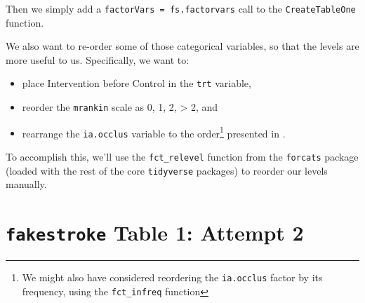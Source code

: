 \documentclass[]{book}
\newenvironment{Shaded}{\begin{snugshade}}{\end{snugshade}}
\newcommand{\KeywordTok}[1]{\textcolor[rgb]{0.13,0.29,0.53}{\textbf{#1}}}
\newcommand{\DataTypeTok}[1]{\textcolor[rgb]{0.13,0.29,0.53}{#1}}
\newcommand{\StringTok}[1]{\textcolor[rgb]{0.31,0.60,0.02}{#1}}
\newcommand{\OperatorTok}[1]{\textcolor[rgb]{0.81,0.36,0.00}{\textbf{#1}}}
\newcommand{\NormalTok}[1]{#1}
\providecommand{\tightlist}{%
  \setlength{\itemsep}{0pt}\setlength{\parskip}{0pt}}
\let\rmarkdownfootnote\footnote%
\def\footnote{\protect\rmarkdownfootnote}
\theoremstyle{definition}
\theoremstyle{definition}
\theoremstyle{definition}
\theoremstyle{remark}
\begin{document}
Then we simply add a \texttt{factorVars\ =\ fs.factorvars} call to the
\texttt{CreateTableOne} function.

We also want to re-order some of those categorical variables, so that
the levels are more useful to us. Specifically, we want to:

\begin{itemize}
\tightlist
\item
  place Intervention before Control in the \texttt{trt} variable,
\item
  reorder the \texttt{mrankin} scale as 0, 1, 2, \textgreater{} 2, and
\item
  rearrange the \texttt{ia.occlus} variable to the order\footnote{We
    might also have considered reordering the \texttt{ia.occlus} factor
    by its frequency, using the \texttt{fct\_infreq} function} presented
  in \citet{Berkhemer2015}.
\end{itemize}

To accomplish this, we'll use the \texttt{fct\_relevel} function from
the \texttt{forcats} package (loaded with the rest of the core
\texttt{tidyverse} packages) to reorder our levels manually.

\begin{Shaded}
\end{Shaded}

\section{\texorpdfstring{\texttt{fakestroke} Table 1: Attempt
2}{fakestroke Table 1: Attempt 2}}\label{fakestroke-table-1-attempt-2}
\end{document}
